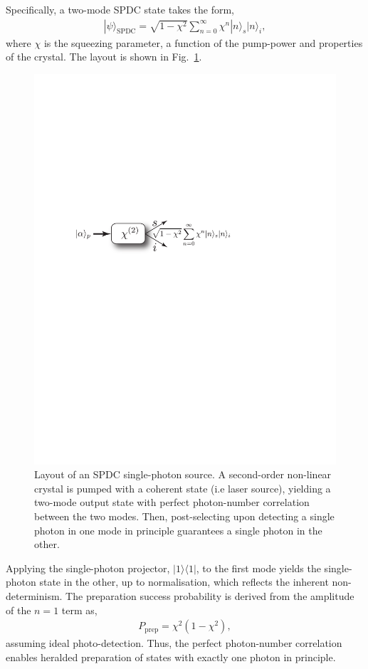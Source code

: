 \documentclass[aps, rmp, twocolumn, amsmath, amssymb, nofootinbib, superscriptaddress, longbibliography, floatfix, table-of-contents, eqsecnum]{revtex4-1}
\newcommand{\bra}[1]{\langle#1|}
\newcommand{\ket}[1]{|#1\rangle}
\begin{document}
Specifically, a two-mode SPDC state takes the form,
\begin{align}
\ket\psi_\text{SPDC} = \sqrt{1-\chi^2} \sum_{n=0}^\infty \chi^n \ket{n}_s\ket{n}_i,
\end{align}
where $\chi$ is the squeezing parameter, a function of the pump-power and properties of the crystal. The layout is shown in Fig.~\ref{fig:SPDC_source}.

\begin{figure}[!htb]
\includegraphics[width=0.9\columnwidth]{SPDC_source}
\caption{Layout of an SPDC single-photon source. A second-order non-linear crystal is pumped with a coherent state (i.e laser source), yielding a two-mode output state with perfect photon-number correlation between the two modes. Then, post-selecting upon detecting a single photon in one mode in principle guarantees a single photon in the other.} \label{fig:SPDC_source}
\end{figure}

Applying the single-photon projector, \mbox{$\ket{1}\bra{1}$}, to the first mode yields the single-photon state in the other, up to normalisation, which reflects the inherent non-determinism. The preparation success probability is derived from the amplitude of the \mbox{$n=1$} term as,
\begin{align} \label{eq:SPDC_p_prep}
P_\text{prep}=\chi^2(1-\chi^2),
\end{align}
assuming ideal photo-detection. Thus, the perfect photon-number correlation enables heralded preparation of states with exactly one photon in principle.
\end{document}
